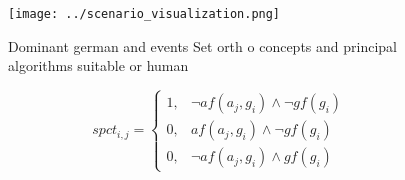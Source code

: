 \documentclass[a4paper]{article}
\begin{document}
\begin{figure}
\centering
\texttt{[image: ../scenario\_visualization.png]}
\caption{Dominant german and events Set orth o concepts and principal algorithms suitable or human
}
\end{figure}
 
\begin{equation}
spct_{i,j} =
\begin{cases}
1, & \text{$\neg af(a_j,g_i) \wedge \neg gf(g_i)$}\\
0, & \text{$af(a_j,g_i) \wedge \neg gf(g_i)$}\\
0, & \text{$\neg af(a_j,g_i) \wedge gf(g_i)$}
\end{cases}
\end{equation}
\end{document}
